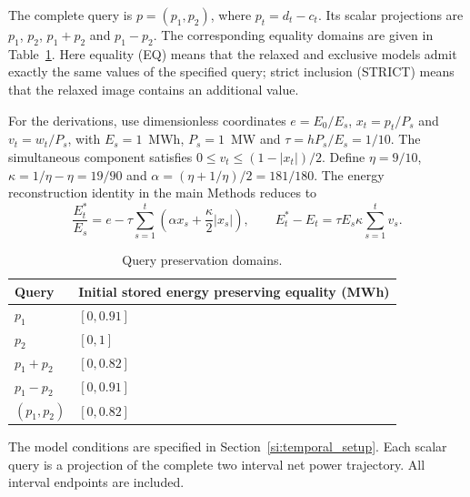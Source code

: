 The complete query is $p=(p_1,p_2)$, where $p_t=d_t-c_t$. Its scalar projections are $p_1$, $p_2$, $p_1+p_2$ and $p_1-p_2$. The corresponding equality domains are given in Table~\ref{tab:si_temporal_domains}. Here equality (EQ) means that the relaxed and exclusive models admit exactly the same values of the specified query; strict inclusion (STRICT) means that the relaxed image contains an additional value.

For the derivations, use dimensionless coordinates $e=E_0/E_s$, $x_t=p_t/P_s$ and $v_t=w_t/P_s$, with $E_s=1$~MWh, $P_s=1$~MW and $\tau=hP_s/E_s=1/10$. The simultaneous component satisfies $0\leq v_t\leq(1-|x_t|)/2$. Define $\eta=9/10$, $\kappa=1/\eta-\eta=19/90$ and $\alpha=(\eta+1/\eta)/2=181/180$. The energy reconstruction identity in the main Methods reduces to
\begin{equation}
\frac{E_t^*}{E_s}
=e-\tau\sum_{s=1}^{t}\left(\alpha x_s+\frac{\kappa}{2}|x_s|\right),
\qquad
E_t^*-E_t=\tau E_s\kappa\sum_{s=1}^{t}v_s.
\label{eq:si_temporal_reconstruction}
\end{equation}

\begin{table}[t]

\caption{Query preservation domains.}
\label{tab:si_temporal_domains}
\begin{tabularx}{\linewidth}{@{}l X@{}}
\toprule
Query & Initial stored energy preserving equality (MWh) \\
\midrule
$p_1$ & $[0,0.91]$ \\
$p_2$ & $[0,1]$ \\
$p_1+p_2$ & $[0,0.82]$ \\
$p_1-p_2$ & $[0,0.91]$ \\
$(p_1,p_2)$ & $[0,0.82]$ \\
\bottomrule
\end{tabularx}
\par\smallskip
\begin{minipage}{\linewidth}
The model conditions are specified in Section~\ref{si:temporal_setup}. Each scalar query is a projection of the complete two interval net power trajectory. All interval endpoints are included.
\end{minipage}
\end{table}



